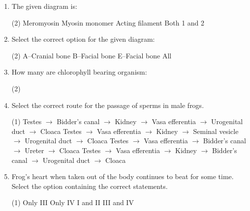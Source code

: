 \documentclass[twocolumn]{article}
\begin{document}
\begin{enumerate}
    Choose the correct answer from the option given below:
    \begin{tasks}(1)
        \task Both Statement I and Statement II are incorrect
        \task Statement I is correct but Statement II is incorrect
        \task Statement I is incorrect but Statement II is correct
        \task Both Statement I and Statement II are correct
    \end{tasks}
    \item The given diagram is: \\
    \begin{center}
    \end{center}
    \begin{tasks}(2)
        \task Meromyosin
        \task Myosin monomer
        \task Acting filament
        \task Both 1 and 2
    \end{tasks}
    \item Select the correct option for the given diagram: \\
    \begin{center}
    \end{center}
    \begin{tasks}(2)
        \task A–Cranial bone
        \task B–Facial bone
        \task E–Facial bone
        \task All
    \end{tasks}
    \item How many are chlorophyll bearing organism:
    \begin{tasks}(2)
    \end{tasks}
    \item Select the correct route for the passage of sperms in male frogs.
    \begin{tasks}(1)
        \task Testes $\rightarrow$ Bidder’s canal $\rightarrow$ Kidney $\rightarrow$ Vasa efferentia $\rightarrow$ Urogenital duct $\rightarrow$ Cloaca
        \task Testes $\rightarrow$ Vasa efferentia $\rightarrow$ Kidney $\rightarrow$ Seminal vesicle $\rightarrow$ Urogenital duct $\rightarrow$ Cloaca
        \task Testes $\rightarrow$ Vasa efferentia $\rightarrow$ Bidder’s canal $\rightarrow$ Ureter $\rightarrow$ Cloaca
        \task Testes $\rightarrow$ Vasa efferentia $\rightarrow$ Kidney $\rightarrow$ Bidder’s canal $\rightarrow$ Urogenital duct $\rightarrow$ Cloaca
    \end{tasks}
    \item Frog's heart when taken out of the body continues to beat for some time. Select the option containing the correct statements.
    \begin{tasks}(1)
        \task Only III
        \task Only IV
        \task I and II
        \task III and IV
    \end{tasks}


\end{enumerate}
\end{document}
